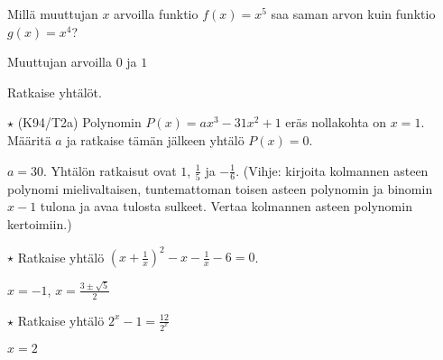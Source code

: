 \begin{tehtavasivu}
\begin{tehtava}
Millä muuttujan $x$ arvoilla funktio $ f(x)=x^5$ saa saman arvon kuin funktio $ g(x)=x^4$?
\begin{vastaus}
Muuttujan arvoilla $0$ ja $1$
\end{vastaus}
\end{tehtava}

\begin{tehtava}
    Ratkaise yhtälöt.
    \begin{vastaus}
    \end{vastaus}
\end{tehtava}

\begin{tehtava}
$\star$ (K94/T2a) Polynomin $P(x)=ax^3-31x^2+1$ eräs nollakohta on $x=1$. Määritä $a$ ja ratkaise tämän jälkeen yhtälö $P(x)=0$.
\begin{vastaus}
      $a=30$. Yhtälön ratkaisut ovat $1$, $\frac{1}{5}$ ja $-\frac{1}{6}$. (Vihje: kirjoita kolmannen asteen polynomi mielivaltaisen, tuntemattoman toisen asteen polynomin ja binomin $x-1$ tulona ja avaa tulosta sulkeet. Vertaa kolmannen asteen polynomin kertoimiin.)
    \end{vastaus}
\end{tehtava}

\begin{tehtava}
	$ \star $ Ratkaise yhtälö $(x+\frac{1}{x})^2-x-\frac{1}{x}-6 = 0$.
	\begin{vastaus}
		$x = -1$, $x = \frac{3\pm \sqrt{5}}{2}$
	\end{vastaus}
\end{tehtava}

\begin{tehtava}
	$ \star $ Ratkaise yhtälö $2^x-1=\frac{12}{2^x}$
	\begin{vastaus}
	$x=2$
	\end{vastaus}
\end{tehtava}

\end{tehtavasivu}